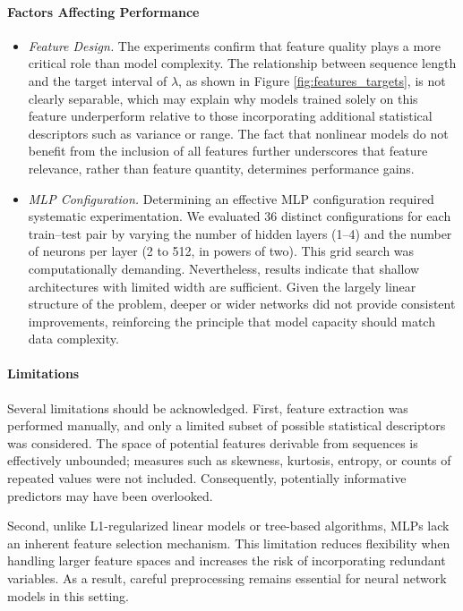 \documentclass[12pt]{article}
\begin{document}
\paragraph{Factors Affecting Performance}
\begin{itemize}
    \item \textit{Feature Design.} The experiments confirm that feature quality plays a more critical role than model complexity. The relationship between sequence length and the target interval of $\lambda$, as shown in Figure \ref{fig:features_targets}, is not clearly separable, which may explain why models trained solely on this feature underperform relative to those incorporating additional statistical descriptors such as variance or range. The fact that nonlinear models do not benefit from the inclusion of all features further underscores that feature relevance, rather than feature quantity, determines performance gains.
    \item \textit{MLP Configuration.} Determining an effective MLP configuration required systematic experimentation. We evaluated 36 distinct configurations for each train–test pair by varying the number of hidden layers (1–4) and the number of neurons per layer (2 to 512, in powers of two). This grid search was computationally demanding. Nevertheless, results indicate that shallow architectures with limited width are sufficient. Given the largely linear structure of the problem, deeper or wider networks did not provide consistent improvements, reinforcing the principle that model capacity should match data complexity.
\end{itemize}



\paragraph{Limitations}

Several limitations should be acknowledged. First, feature extraction was performed manually, and only a limited subset of possible statistical descriptors was considered. The space of potential features derivable from sequences is effectively unbounded; measures such as skewness, kurtosis, entropy, or counts of repeated values were not included. Consequently, potentially informative predictors may have been overlooked.

Second, unlike L1-regularized linear models or tree-based algorithms, MLPs lack an inherent feature selection mechanism. This limitation reduces flexibility when handling larger feature spaces and increases the risk of incorporating redundant variables. As a result, careful preprocessing remains essential for neural network models in this setting.
\end{document}

